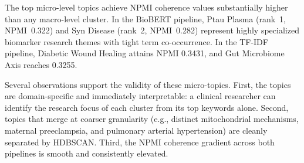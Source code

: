 \documentclass[a4paper,10pt,conference]{IEEEtran}
\begin{document}
\begin{table}[t]
\centering
\caption{Micro-level topic discovery: top 10 HDBSCAN clusters from the sparse TF-IDF pipeline ranked by NPMI coherence (out of 116 total discovered topics).}
\label{tab:micro_tfidf}
\end{table}

The top micro-level topics achieve NPMI coherence values substantially higher than any macro-level cluster. In the BioBERT pipeline, Ptau Plasma (rank~1, NPMI~0.322) and Syn Disease (rank~2, NPMI~0.282) represent highly specialized biomarker research themes with tight term co-occurrence. In the TF-IDF pipeline, Diabetic Wound Healing attains NPMI 0.3431, and Gut Microbiome Axis reaches 0.3255.

Several observations support the validity of these micro-topics. First, the topics are domain-specific and immediately interpretable: a clinical researcher can identify the research focus of each cluster from its top keywords alone. Second, topics that merge at coarser granularity (e.g., distinct mitochondrial mechanisms, maternal preeclampsia, and pulmonary arterial hypertension) are cleanly separated by HDBSCAN. Third, the NPMI coherence gradient across both pipelines is smooth and consistently elevated.
\end{document}
